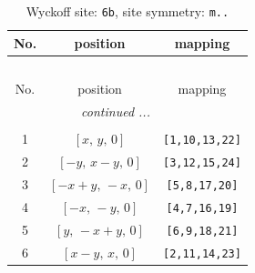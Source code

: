 \documentclass[fleqn,8pt]{jsarticle}
\begin{document}
\begin{longtable}{ccc}
\caption{Wyckoff site: {\tt 6b}, site symmetry: {\tt m..}}
 \\
 \hline \hline
No. & position & mapping \\ \hline \endfirsthead

\multicolumn{2}{l}{\tablename\ \thetable{}} \\
 \hline \hline
No. & position & mapping \\ \hline \endhead

 \hline \hline
\multicolumn{2}{r}{\footnotesize\it continued ...} \\ \endfoot

 \hline \hline
\multicolumn{2}{r}{} \\ \endlastfoot

1 & $\left[ x,\, y,\, 0 \right]$ & {\tt [1,10,13,22]} \\ \hline
2 & $\left[ - y,\, x - y,\, 0 \right]$ & {\tt [3,12,15,24]} \\ \hline
3 & $\left[ - x + y,\, - x,\, 0 \right]$ & {\tt [5,8,17,20]} \\ \hline
4 & $\left[ - x,\, - y,\, 0 \right]$ & {\tt [4,7,16,19]} \\ \hline
5 & $\left[ y,\, - x + y,\, 0 \right]$ & {\tt [6,9,18,21]} \\ \hline
6 & $\left[ x - y,\, x,\, 0 \right]$ & {\tt [2,11,14,23]} \\
\end{longtable}
\renewcommand{\arraystretch}{1.2}
\end{document}
